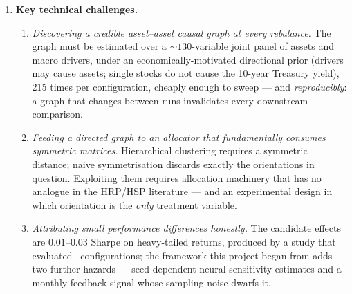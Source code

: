 \begin{enumerate}
  \item \textbf{Key technical challenges.}
  \begin{enumerate}[label=\textbf{C\arabic*}]
    \item \emph{Discovering a credible asset--asset causal graph at every
      rebalance.} The graph must be estimated over a ${\sim}130$-variable
      joint panel of assets and macro drivers, under an economically-motivated
      directional prior (drivers may cause assets; single stocks do not cause
      the 10-year Treasury yield), 215 times per configuration, cheaply enough
      to sweep --- and \emph{reproducibly}: a graph that changes between runs
      invalidates every downstream comparison.
    \item \emph{Feeding a directed graph to an allocator that fundamentally
      consumes symmetric matrices.} Hierarchical clustering requires a
      symmetric distance; naive symmetrisation discards exactly the
      orientations in question. Exploiting them requires allocation machinery
      that has no analogue in the HRP/HSP literature --- and an experimental
      design in which orientation is the \emph{only} treatment variable.
    \item \emph{Attributing small performance differences honestly.} The
      candidate effects are $0.01$--$0.03$ Sharpe on heavy-tailed returns,
      produced by a study that evaluated \rsNtrials\ configurations; the
      framework this project began from adds two further hazards ---
      seed-dependent neural sensitivity estimates and a monthly feedback
      signal whose sampling noise dwarfs it.
  \end{enumerate}


\end{enumerate}
